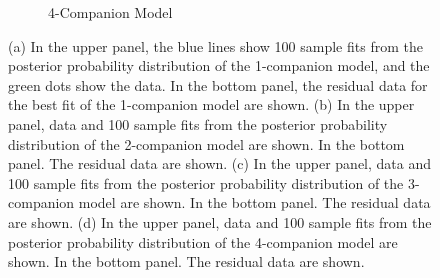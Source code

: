 \documentclass[letterpaper, preprint]{aastex}
\begin{document}
\begin{figure}
\begin{subfigure}[b]{0.49\textwidth}
		\caption{4-Companion Model}
	\end{subfigure}
 \caption{(a) In the upper panel, the blue lines show 100 sample fits from the posterior probability distribution of the 1-companion model, and the green dots show the data. In the bottom panel, the residual data for the best fit of the 1-companion model are shown. (b) In the upper panel, data and 100 sample fits from the posterior probability distribution of the 2-companion model are shown. In the bottom panel. The residual data are shown. (c) In the upper panel, data and 100 sample fits from the posterior probability distribution of the 3-companion model are shown. In the bottom panel. The residual data are shown. (d) In the upper panel, data and 100 sample fits from the posterior probability distribution of the 4-companion model are shown. In the bottom panel. The residual data are shown.}
 \label{fig:282-fits}
\end{figure}
\end{document}
